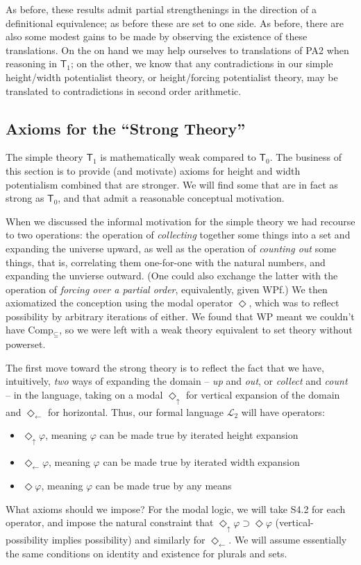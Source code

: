 \documentclass{article}
\newcommand{\du}{\Diamond_\uparrow}
\newcommand{\dl}{\Diamond_\leftarrow}
\begin{document}
As before, these results admit partial strengthenings in the direction of a definitional
equivalence; as before these are set to one side. As before, there are also 
some modest gains to be made by observing the existence of these translations. 
On the on hand we may help ourselves to translations of PA2 when reasoning in $\mathsf{T}_1$;
on the other, we know that any contradictions in our simple height/width potentialist theory,
or height/forcing potentialist theory, may be translated to contradictions in 
second order arithmetic.

\subsection{Axioms for the ``Strong Theory''}

The simple theory $\mathsf{T}_1$ is mathematically weak compared to $\mathsf{T}_0$.
The business of this section is to provide (and motivate) axioms for height and width 
potentialism combined that are stronger. We will find some that are in fact 
as strong as $\mathsf{T}_0$, and that admit a reasonable conceptual motivation.

When we discussed the informal motivation for the simple theory we had recourse to 
two operations: the operation of \emph{collecting} together some things into a set and expanding 
the universe upward,
as well as the operation of \emph{counting out} some things, that is, correlating them 
one-for-one with the natural numbers, and expanding the unvierse outward.
(One could also exchange the latter with the operation of \emph{forcing over a partial order}, 
equivalently, given WPf.)
We then axiomatized the conception using 
the modal operator $\Diamond$, which was to reflect possibility by arbitrary 
iterations of either. We found that WP meant we couldn't have Comp$_\subseteq$, 
so we were left with a weak theory equivalent to set theory without powerset.

The first move toward the strong theory is to reflect the fact that we have, 
intuitively, \emph{two} ways of expanding the domain -- \emph{up} and \emph{out}, 
or \emph{collect} and \emph{count} -- in the language, taking on a modal $\du$ for vertical 
expansion of the domain and $\dl$ for horizontal. Thus, our formal language $\mathcal{L_2}$
will have operators:
\begin{itemize}
    \item $\du \varphi$, meaning $\varphi$ can be made true by iterated height expansion
    \item $\dl \varphi$, meaning $\varphi$ can be made true by iterated width expansion
    \item $\Diamond \varphi$, meaning $\varphi$ can be made true by any means
\end{itemize}
What axioms should we impose? For the modal logic, we will 
take S4.2 for each operator, and impose the natural constraint that $\du \varphi \supset \Diamond \varphi$ 
(vertical-possibility implies possibility) and similarly for $\dl$. 
We will assume essentially the same conditions on identity and existence for plurals and sets.
\end{document}
